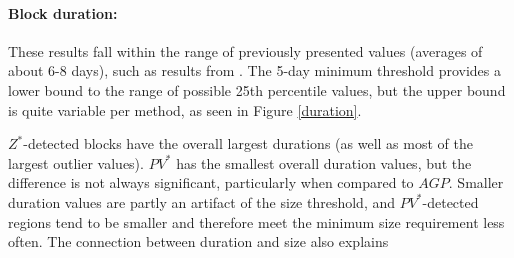 \documentclass[smallextended]{svjour3}       %
\numberwithin{equation}{section}
\begin{document}



\paragraph{Block duration:} These results fall within the range of previously presented values (averages of about 6-8 days), such as results from \citealt{wiedenmann_climatology_2002}. The 5-day minimum threshold provides a lower bound to the range of possible 25th percentile values, but the upper bound is quite variable per method, as seen in Figure \ref{duration}. 

{\color{blue} $Z^*$-detected blocks have the overall largest durations (as well as most of the largest outlier values). $PV^*$ has the smallest overall duration values, but the difference is not always significant, particularly when compared to $AGP$.  Smaller duration values are partly an artifact of the size threshold, and $PV^*$-detected regions tend to be smaller and therefore meet the minimum size requirement less often. The connection between duration and size also explains }
\end{document}
